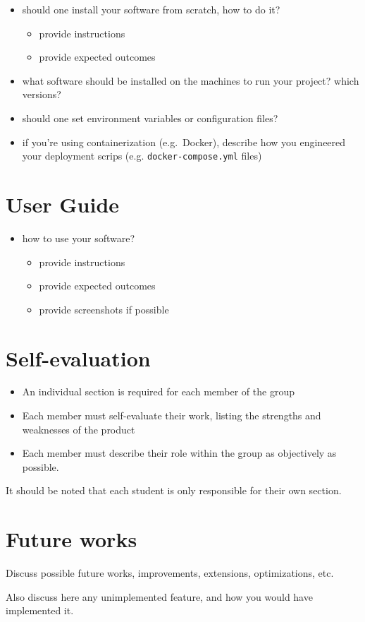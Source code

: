 \documentclass{scrartcl}
\begin{document}
\begin{itemize}
	\item should one install your software from scratch, how to do it?
	\begin{itemize}
		\item provide instructions
		\item provide expected outcomes
	\end{itemize}
	
	\item what software should be installed on the machines to run your project? which versions?
	
	\item should one set environment variables or configuration files?
	
	\item if you're using containerization (e.g.~Docker), 
	describe how you engineered your deployment scrips (e.g. \texttt{docker-compose.yml} files)
\end{itemize}

\section{User Guide}\label{user-guide}

\begin{itemize}
	\item how to use your software?
	\begin{itemize}
		\item provide instructions
		\item provide expected outcomes
		\item provide screenshots if possible
	\end{itemize}
\end{itemize}

\section{Self-evaluation}\label{self-evaluation}

\begin{itemize}
	\item An individual section is required for each member of the group
	\item Each member must self-evaluate their work, listing the strengths and weaknesses of the product
	\item Each member must describe their role within the group as objectively as possible.
\end{itemize}

It should be noted that each student is only responsible for their own section.

\section{Future works}\label{future-works}

Discuss possible future works, improvements, extensions, optimizations, etc.

Also discuss here any unimplemented feature, and how you would have implemented it.

\nocite{*}


\end{document}

